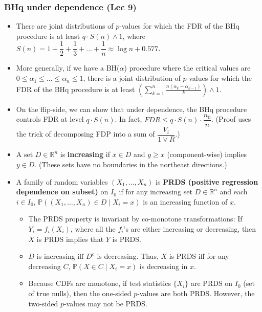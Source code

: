 \documentclass[twoside]{article}
\newcommand\dis{\displaystyle}
\newcommand\bbP{\mathbb{P}}
\newcommand\bbR{\mathbb{R}}
\begin{document}
\subsubsection{BHq under dependence (Lec 9)}
\begin{itemize}
\item There are joint distributions of $p$-values for which the FDR of the BHq procedure is at least $q \cdot S(n) \wedge 1$, where $S(n) = 1 + \dfrac{1}{2} + \dfrac{1}{3} + \dots + \dfrac{1}{n} \approx \log n + 0.577$.

\item More generally, if we have a BH($\alpha$) procedure where the critical values are $0 \leq \alpha_1 \leq \dots \leq \alpha_n \leq 1$, there is a joint distribution of $p$-values for which the FDR of the BHq procedure is at least $\left( \dis\sum_{k=1}^n \frac{n(\alpha_k - \alpha_{k-1})}{k} \right) \wedge 1$.

\item On the flip-side, we can show that under dependence, the BHq procedure controls FDR at level $q \cdot S(n)$. In fact, $FDR \leq q \cdot S(n) \cdot \dfrac{n_0}{n}$. (Proof uses the trick of decomposing FDP into a sum of $\dfrac{V_i}{1 \vee R}$.)

\item A set $D \in \bbR^n$ is \textbf{increasing} if $x \in D$ and $y \geq x$ (component-wise) implies $y \in D$. (These sets have no boundaries in the northeast directions.)

\item A family of random variables $(X_1, \dots, X_n)$ is \textbf{PRDS (positive regression dependence on subset)} on $I_0$ if for any increasing set $D \in \bbR^n$ and each $i \in I_0$, $\bbP ((X_1, \dots, X_n) \in D \mid X_i = x)$ is an increasing function of $x$.
\begin{itemize}
\item The PRDS property is invariant by co-monotone transformations: If $Y_i = f_i(X_i)$, where all the $f_i$'s are either increasing or decreasing, then $X$ is PRDS implies that $Y$ is PRDS.

\item $D$ is increasing iff $D^c$ is decreasing. Thus, $X$ is PRDS iff for any decreasing $C$, $\bbP(X \in C \mid X_i = x)$ is decreasing in $x$.

\item Because CDFs are monotone, if test statistics $\{ X_i\}$ are PRDS on $I_0$ (set of true nulls), then the one-sided $p$-values are both PRDS. However, the two-sided $p$-values may not be PRDS.


\end{itemize}
\end{itemize}
\end{document}
